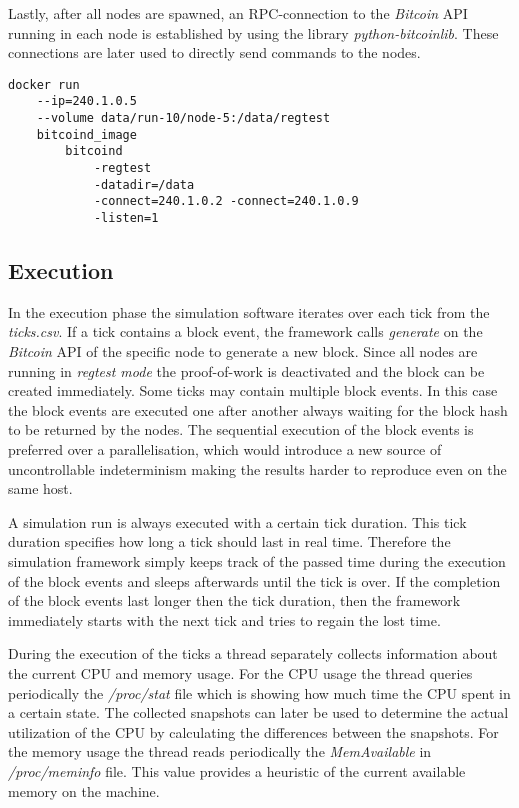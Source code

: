 Lastly, after all nodes are spawned, an RPC-connection to the \textit{Bitcoin} API running in each node is established by using the library \textit{python-bitcoinlib}.
These connections are later used to directly send commands to the nodes.

\begin{minipage}{\linewidth}
\begin{lstlisting}[caption=Simplified version of how a node is started with \textit{Docker} and \textit{bitcoind}, label={lst:docker_create}, basicstyle=\ttfamily, captionpos=b]
docker run
	--ip=240.1.0.5
	--volume data/run-10/node-5:/data/regtest
	bitcoind_image
		bitcoind
			-regtest
			-datadir=/data
			-connect=240.1.0.2 -connect=240.1.0.9
			-listen=1
\end{lstlisting}
\end{minipage}
	
\subsection{Execution}

In the execution phase the simulation software iterates over each tick from the \textit{ticks.csv}.
If a tick contains a block event, the framework calls \textit{generate} on the \textit{Bitcoin} API of the specific node to generate a new block.
Since all nodes are running in \textit{regtest mode} the proof-of-work is deactivated and the block can be created immediately.
Some ticks may contain multiple block events.
In this case the block events are executed one after another always waiting for the block hash to be returned by the nodes.
The sequential execution of the block events is preferred over a parallelisation, which would introduce a new source of uncontrollable indeterminism making the results harder to reproduce even on the same host.

A simulation run is always executed with a certain tick duration.
This tick duration specifies how long a tick should last in real time.
Therefore the simulation framework simply keeps track of the passed time during the execution of the block events and sleeps afterwards until the tick is over.
If the completion of the block events last longer then the tick duration, then the framework immediately starts with the next tick and tries to regain the lost time.

During the execution of the ticks a thread separately collects information about the current CPU and memory usage.
For the CPU usage the thread queries periodically the \textit{/proc/stat} file which is showing how much time the CPU spent in a certain state. 
The collected snapshots can later be used to determine the actual utilization of the CPU by calculating the differences between the snapshots.
For the memory usage the thread reads periodically the \textit{MemAvailable} in \textit{/proc/meminfo} file.
This value provides a heuristic of the current available memory on the machine.

